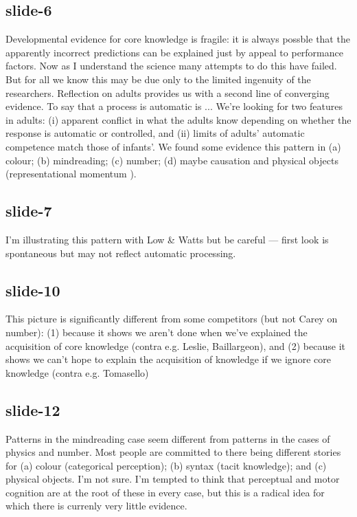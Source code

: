 \documentclass[12pt,\papersize]{extarticle}
\begin{document}
 
\subsection{slide-6}
Developmental evidence for core knowledge is fragile:
it is always possble that the apparently incorrect predictions can be explained just by appeal to performance factors.
Now as I understand the science many attempts to do this have failed.
But for all we know this may be due only to the limited ingenuity of the researchers.
Reflection on adults provides us with a second line of converging evidence.
To say that a process is automatic is ...
We're looking for two features in adults:
(i) apparent conflict in what the adults know depending on whether the response is automatic or controlled,
and (ii) limits of adults' automatic competence match those of infants'.
We found some evidence this pattern in (a) colour; (b) mindreading; (c) number; (d) maybe causation and physical objects (representational momentum \citep{kozhevnikov:2001_impetus}).
 
 
\subsection{slide-7}
I'm illustrating this pattern with Low \& Watts but be careful --- first look is spontaneous but may not reflect automatic processing.
 
 
\subsection{slide-10}
This picture is significantly different from some competitors (but not Carey on number):
(1) because it shows we aren't done when we've explained the acquisition of core knowledge (contra e.g. Leslie, Baillargeon), and
(2) because it shows we can't hope to explain the acquisition of knowledge if we ignore core knowledge (contra e.g. Tomasello)
 
 
\subsection{slide-12}
Patterns in the mindreading case seem different from patterns in the cases of physics and number.
Most people are committed to there being different stories for (a) colour (categorical perception); (b) syntax (tacit knowledge); and (c) physical objects.
I'm not sure. I'm tempted to think that perceptual and motor cognition are at the root of these in every case, but this is a radical idea for which there is currenly very little evidence.
 
\end{document}
